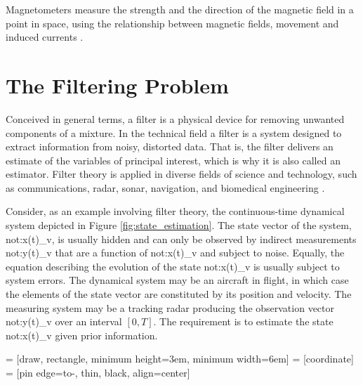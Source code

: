 Magnetometers measure the strength and the direction of the magnetic field in a point in space, using the relationship between magnetic fields, movement and induced currents \cite{olivares_vicente_signal_2013}.


\section{The Filtering Problem}

Conceived in general terms, a filter is a physical device for removing unwanted components of a mixture. In the technical field a filter is a system designed to extract information from noisy, distorted data. That is, the filter delivers an estimate of the variables of principal interest, which is why it is also called an estimator. Filter theory is applied in diverse fields of science and technology, such as communications, radar, sonar, navigation, and biomedical engineering \cite{haykin2002adaptive}.

Consider, as an example involving filter theory, the continuous-time dynamical system depicted in Figure \ref{fig:state_estimation}. The state vector of the system, \gls{not:x(t)_v}, is usually hidden and can only be observed by indirect measurements \gls{not:y(t)_v} that are a function of \gls{not:x(t)_v} and subject to noise. Equally, the equation describing the evolution of the state \gls{not:x(t)_v} is usually subject to system errors. The dynamical system may be an aircraft in flight, in which case the elements of the state vector are constituted by its position and velocity. The measuring system may be a tracking radar producing the observation vector \gls{not:y(t)_v} over an interval $[0, T]$. The requirement is to estimate the state \gls{not:x(t)_v} given prior information.

 = [draw, rectangle, minimum height=3em, minimum width=6em]
 = [coordinate]
 = [pin edge={to-, thin, black}, align=center]

